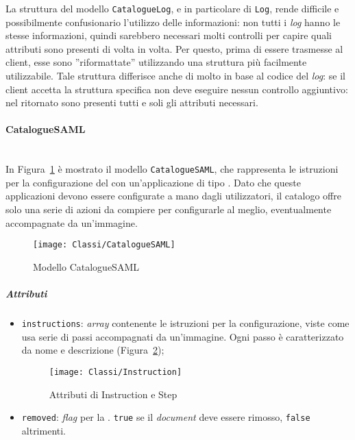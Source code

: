 La struttura del modello \texttt{CatalogueLog}, e in particolare di \texttt{Log}, rende difficile e possibilmente confusionario l'utilizzo delle informazioni: non tutti i \textit{log} hanno le stesse informazioni, quindi sarebbero necessari molti controlli per capire quali attributi sono presenti di volta in volta. Per questo, prima di essere trasmesse al client, esse sono ''riformattate'' utilizzando una struttura più facilmente utilizzabile. Tale struttura differisce anche di molto in base al codice del \textit{log}: se il client accetta la struttura specifica non deve eseguire nessun controllo aggiuntivo: nel  ritornato sono presenti tutti e soli gli attributi necessari.

\paragraph{CatalogueSAML} \mbox{} \\
In Figura~\ref{fig:CatalogueSAML} è mostrato il modello \texttt{CatalogueSAML}, che rappresenta le istruzioni per la configurazione del  con un'applicazione di tipo . Dato che queste applicazioni devono essere configurate a mano dagli utilizzatori, il catalogo offre solo una serie di azioni da compiere per configurarle al meglio, eventualmente accompagnate da un'immagine.
\begin{figure}[hbpc]
	\begin{center}
  		\texttt{[image: Classi/CatalogueSAML]}
 		\caption[Modello CatalogueSAML]{Modello CatalogueSAML}
 		\label{fig:CatalogueSAML}
 	\end{center} 
\end{figure}
\subparagraph{Attributi}
\begin{itemize}
\item \texttt{instructions}: \textit{array} contenente le istruzioni per la configurazione, viste come usa serie di passi accompagnati da un'immagine. Ogni passo è caratterizzato da nome e descrizione (Figura~\ref{fig:Instruction});
\begin{figure}[hbpc]
	\begin{center}
  		\texttt{[image: Classi/Instruction]}
 		\caption[Attributi di Instruction e Step]{Attributi di Instruction e Step}
 		\label{fig:Instruction}
 	\end{center} 
\end{figure}
\item \texttt{removed}: \textit{flag} per la . \texttt{true} se il \textit{document} deve essere rimosso, \texttt{false} altrimenti.
\end{itemize}

